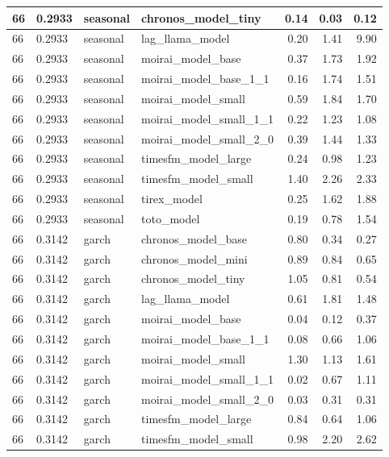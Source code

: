 {\begin{tabular}{llllrrr}
\midrule
66 & 0.2933 & seasonal & chronos\_model\_tiny & 0.14 & 0.03 & 0.12 \\
\midrule
66 & 0.2933 & seasonal & lag\_llama\_model & 0.20 & 1.41 & 9.90 \\
\midrule
66 & 0.2933 & seasonal & moirai\_model\_base & 0.37 & 1.73 & 1.92 \\
\midrule
66 & 0.2933 & seasonal & moirai\_model\_base\_1\_1 & 0.16 & 1.74 & 1.51 \\
\midrule
66 & 0.2933 & seasonal & moirai\_model\_small & 0.59 & 1.84 & 1.70 \\
\midrule
66 & 0.2933 & seasonal & moirai\_model\_small\_1\_1 & 0.22 & 1.23 & 1.08 \\
\midrule
66 & 0.2933 & seasonal & moirai\_model\_small\_2\_0 & 0.39 & 1.44 & 1.33 \\
\midrule
66 & 0.2933 & seasonal & timesfm\_model\_large & 0.24 & 0.98 & 1.23 \\
\midrule
66 & 0.2933 & seasonal & timesfm\_model\_small & 1.40 & 2.26 & 2.33 \\
\midrule
66 & 0.2933 & seasonal & tirex\_model & 0.25 & 1.62 & 1.88 \\
\midrule
66 & 0.2933 & seasonal & toto\_model & 0.19 & 0.78 & 1.54 \\
\midrule
66 & 0.3142 & garch & chronos\_model\_base & 0.80 & 0.34 & 0.27 \\
\midrule
66 & 0.3142 & garch & chronos\_model\_mini & 0.89 & 0.84 & 0.65 \\
\midrule
66 & 0.3142 & garch & chronos\_model\_tiny & 1.05 & 0.81 & 0.54 \\
\midrule
66 & 0.3142 & garch & lag\_llama\_model & 0.61 & 1.81 & 1.48 \\
\midrule
66 & 0.3142 & garch & moirai\_model\_base & 0.04 & 0.12 & 0.37 \\
\midrule
66 & 0.3142 & garch & moirai\_model\_base\_1\_1 & 0.08 & 0.66 & 1.06 \\
\midrule
66 & 0.3142 & garch & moirai\_model\_small & 1.30 & 1.13 & 1.61 \\
\midrule
66 & 0.3142 & garch & moirai\_model\_small\_1\_1 & 0.02 & 0.67 & 1.11 \\
\midrule
66 & 0.3142 & garch & moirai\_model\_small\_2\_0 & 0.03 & 0.31 & 0.31 \\
\midrule
66 & 0.3142 & garch & timesfm\_model\_large & 0.84 & 0.64 & 1.06 \\
\midrule
66 & 0.3142 & garch & timesfm\_model\_small & 0.98 & 2.20 & 2.62 \\
\midrule

\end{tabular}}
